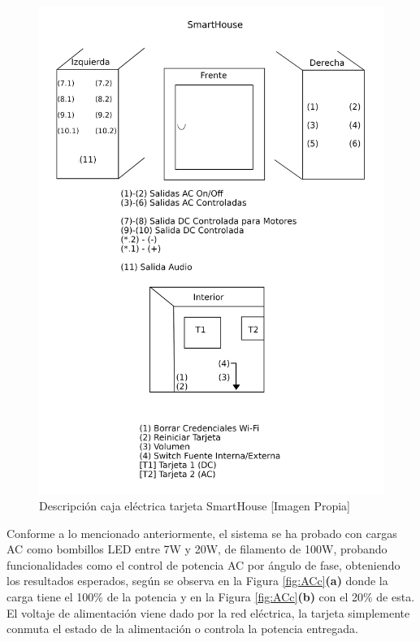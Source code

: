 \begin{figure}
	\centering
	\caption{Descripción caja eléctrica tarjeta SmartHouse [Imagen Propia]}
	\label{fig:labels}
	\includegraphics[width=0.7\linewidth]{Imagenes/labels}
\end{figure}


Conforme a lo mencionado anteriormente, el sistema se ha probado con cargas AC como bombillos LED entre 7W y 20W, de filamento de 100W, probando funcionalidades como el control de potencia AC por ángulo de fase, obteniendo los resultados esperados, según se observa en la Figura \ref{fig:ACc}\textbf{(a)} donde la carga tiene el 100\% de la potencia y en la Figura \ref{fig:ACc}\textbf{(b)} con el 20\% de esta. El voltaje de alimentación viene dado por la red eléctrica, la tarjeta simplemente conmuta el estado de la alimentación o controla la potencia entregada. 

